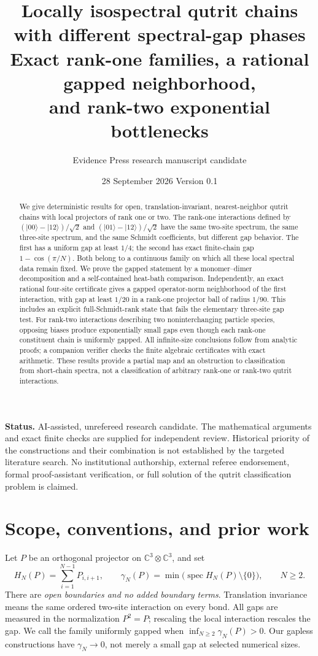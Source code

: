 \documentclass[11pt,a4paper]{article}
\title{\textbf{Locally isospectral qutrit chains\\with different spectral-gap phases}\\[5pt]
\large Exact rank-one families, a rational gapped neighborhood,\\and rank-two exponential bottlenecks}
\author{Evidence Press research manuscript candidate}
\date{28 September 2026 \quad Version 0.1}
\theoremstyle{remark}\newtheorem{remark}[theorem]{Remark}
\newcommand{\C}{\mathbb C}
\newcommand{\ket}[1]{\lvert #1\rangle}
\newcommand{\spec}{\operatorname{spec}}
\begin{document}
\maketitle
\begin{abstract}
We give deterministic results for open, translation-invariant, nearest-neighbor qutrit chains with local projectors of rank one or two. The rank-one interactions defined by $(\ket{00}-\ket{12})/\sqrt2$ and $(\ket{01}-\ket{12})/\sqrt2$ have the same two-site spectrum, the same three-site spectrum, and the same Schmidt coefficients, but different gap behavior. The first has a uniform gap at least $1/4$; the second has exact finite-chain gap $1-\cos(\pi/N)$. Both belong to a continuous family on which all these local spectral data remain fixed. We prove the gapped statement by a monomer--dimer decomposition and a self-contained heat-bath comparison. Independently, an exact rational four-site certificate gives a gapped operator-norm neighborhood of the first interaction, with gap at least $1/20$ in a rank-one projector ball of radius $1/90$. This includes an explicit full-Schmidt-rank state that fails the elementary three-site gap test. For rank-two interactions describing two noninterchanging particle species, opposing biases produce exponentially small gaps even though each rank-one constituent chain is uniformly gapped. All infinite-size conclusions follow from analytic proofs; a companion verifier checks the finite algebraic certificates with exact arithmetic. These results provide a partial map and an obstruction to classification from short-chain spectra, not a classification of arbitrary rank-one or rank-two qutrit interactions.
\end{abstract}
\noindent\textbf{Status.} AI-assisted, unrefereed research candidate. The mathematical arguments and exact finite checks are supplied for independent review. Historical priority of the constructions and their combination is not established by the targeted literature search. No institutional authorship, external referee endorsement, formal proof-assistant verification, or full solution of the qutrit classification problem is claimed.

\section{Scope, conventions, and prior work}
Let $P$ be an orthogonal projector on $\C^3\otimes\C^3$, and set
\begin{equation}\label{eq:HN}
 H_N(P)=\sum_{i=1}^{N-1}P_{i,i+1},\qquad
 \gamma_N(P)=\min\bigl(\spec H_N(P)\setminus\{0\}\bigr),\qquad N\ge2.
\end{equation}
There are \emph{open boundaries and no added boundary terms}. Translation invariance means the same ordered two-site interaction on every bond. All gaps are measured in the normalization $P^2=P$; rescaling the local interaction rescales the gap. We call the family uniformly gapped when $\inf_{N\ge2}\gamma_N(P)>0$. Our gapless constructions have $\gamma_N\to0$, not merely a small gap at selected numerical sizes.
\end{document}
